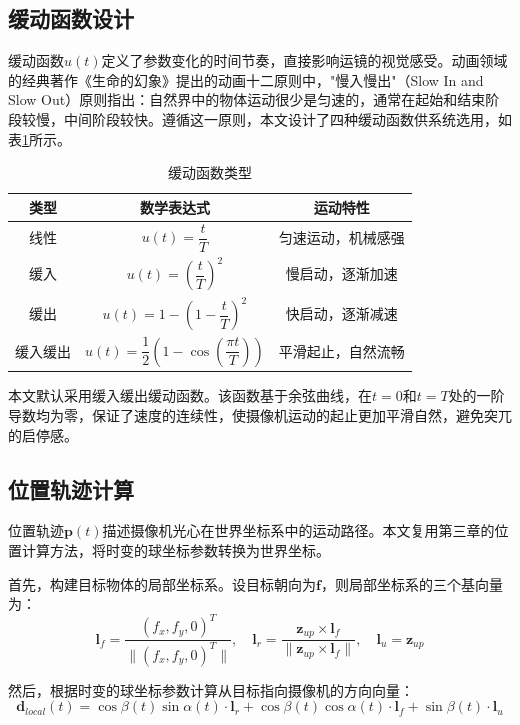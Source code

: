 \subsection{缓动函数设计}

缓动函数$u(t)$定义了参数变化的时间节奏，直接影响运镜的视觉感受。动画领域的经典著作《生命的幻象》\cite{thomas1981illusion}提出的动画十二原则中，"慢入慢出"（Slow In and Slow Out）原则指出：自然界中的物体运动很少是匀速的，通常在起始和结束阶段较慢，中间阶段较快。遵循这一原则，本文设计了四种缓动函数供系统选用，如表\ref{tab:easing_functions}所示。

\begin{table}[htbp]
\centering
\caption{缓动函数类型}
\label{tab:easing_functions}
\begin{tabular}{ccc}
\toprule
类型 & 数学表达式 & 运动特性 \\
\midrule
线性 & $u(t) = \dfrac{t}{T}$ & 匀速运动，机械感强 \\[10pt]
缓入 & $u(t) = \left(\dfrac{t}{T}\right)^2$ & 慢启动，逐渐加速 \\[10pt]
缓出 & $u(t) = 1 - \left(1 - \dfrac{t}{T}\right)^2$ & 快启动，逐渐减速 \\[10pt]
缓入缓出 & $u(t) = \dfrac{1}{2}\left(1 - \cos\left(\dfrac{\pi t}{T}\right)\right)$ & 平滑起止，自然流畅 \\[10pt]
\bottomrule
\end{tabular}
\end{table}

本文默认采用缓入缓出缓动函数。该函数基于余弦曲线，在$t=0$和$t=T$处的一阶导数均为零，保证了速度的连续性，使摄像机运动的起止更加平滑自然，避免突兀的启停感。

\subsection{位置轨迹计算}

位置轨迹$\mathbf{p}(t)$描述摄像机光心在世界坐标系中的运动路径。本文复用第三章的位置计算方法，将时变的球坐标参数转换为世界坐标。

首先，构建目标物体的局部坐标系。设目标朝向为$\mathbf{f}$，则局部坐标系的三个基向量为：
\begin{equation}
\mathbf{l}_f = \frac{(f_x, f_y, 0)^T}{\|(f_x, f_y, 0)^T\|}, \quad
\mathbf{l}_r = \frac{\mathbf{z}_{up} \times \mathbf{l}_f}{\|\mathbf{z}_{up} \times \mathbf{l}_f\|}, \quad
\mathbf{l}_u = \mathbf{z}_{up}
\end{equation}

然后，根据时变的球坐标参数计算从目标指向摄像机的方向向量：
\begin{equation}
\mathbf{d}_{local}(t) = \cos\beta(t)\sin\alpha(t) \cdot \mathbf{l}_r + \cos\beta(t)\cos\alpha(t) \cdot \mathbf{l}_f + \sin\beta(t) \cdot \mathbf{l}_u
\end{equation}


